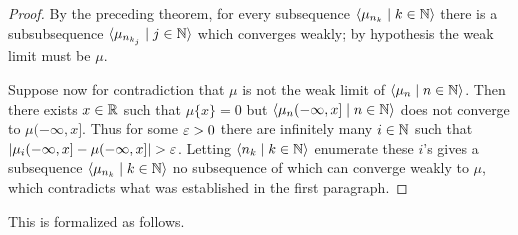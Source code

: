 \documentclass[leqno]{article}
\theoremstyle{definition}
\newcommand{\bldseq}[2]{\langle{#1}\mid{#2}\rangle}
\begin{document}
\begin{proof}
By the preceding theorem, for every subsequence $\bldseq{\mu_{n_k}}{k \in \N}$ there is a subsubsequence $\bldseq{\mu_{n_{k_j}}}{j \in \N}$ which converges weakly; by hypothesis the weak limit must be $\mu$.

Suppose now for contradiction that $\mu$ is not the weak limit of $\bldseq{\mu_n}{n \in \N}$. Then there exists $x \in \mathbb{R}$ such that $\mu \{x\} = 0$ but $\bldseq{\mu_n (-\infty, x]}{n \in \N}$ does not converge to $\mu (-\infty, x]$. Thus for some $\varepsilon > 0$ there are infinitely many $i \in \mathbb{N}$ such that $|\mu_i (-\infty, x] - \mu (-\infty, x]| > \varepsilon$. Letting $\bldseq{n_k}{k \in \N}$ enumerate these $i$'s gives a subsequence $\bldseq{\mu_{n_k}}{k \in \N}$ no subsequence of which can converge weakly to $\mu$, which contradicts what was established in the first paragraph.
\end{proof}

This is formalized as follows.

\medskip
\end{document}
